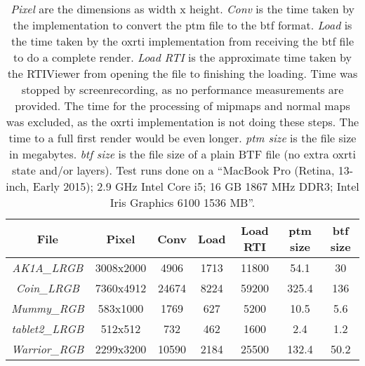 \begin{table}[H]
\begin{tabular}{|c |  c c c c c c|}
 \hline
 File & Pixel & Conv & Load & Load RTI &
 ptm size & btf size\\
  \hline
  \emph{AK1A\_LRGB} & 3008x2000 & 4906 & 1713 & 11800 & 54.1 & 30  \\
  \emph{Coin\_LRGB} & 7360x4912 & 24674 & 8224 & 59200 & 325.4 & 136  \\
  \emph{Mummy\_RGB} & 583x1000 & 1769 & 627 & 5200 & 10.5 & 5.6  \\
  \emph{tablet2\_LRGB} & 512x512 & 732 & 462 & 1600 & 2.4 & 1.2  \\
  \emph{Warrior\_RGB} & 2299x3200 & 10590 & 2184 & 25500 & 132.4 & 50.2  \\
 \hline
\end{tabular}
\caption[Performance Comparison]{\emph{Pixel} are the dimensions as width x height. \emph{Conv} is the time taken
by the implementation to convert the ptm file to the btf format. \emph{Load} is
the time taken by the oxrti implementation from receiving the btf file to do a complete render. \emph{Load
  RTI} is the approximate time taken by the RTIViewer from opening the file to
finishing the loading. Time was stopped by screenrecording, as no performance
measurements are provided. The time for the processing of mipmaps and normal
maps was excluded, as the oxrti implementation is not doing these steps. The
time to a full first render would be even longer. \emph{ptm size} is the file size in
megabytes. \emph{btf size} is the file size of a plain BTF file (no extra oxrti
state and/or layers). Test runs done on a ``MacBook Pro (Retina, 13-inch, Early
2015); 2.9 GHz Intel Core i5; 16 GB 1867 MHz DDR3; Intel Iris Graphics 6100 1536 MB''. }
\label{table_fileformat_results}
\end{table}

